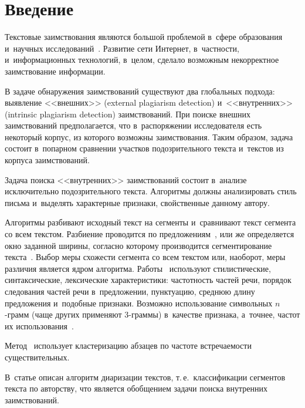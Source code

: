 \thispagestyle{headings}

\begin{multicols}{2}

\label{st\stat}



\section{Введение}

Текстовые заимствования являются большой проблемой в~сфере образования и~научных 
исследований~\cite{Stud_plag}. Развитие сети Интернет, в~част\-ности,
и~информационных технологий, в~целом, сделало возможным некорректное заимствование 
информации.

В задаче обнаружения заимствований существуют два глобальных подхода: выявление 
<<внешних>> (external plagiarism detection) и~<<внутренних>> (intrinsic 
plagiarism detection) заимствований. При поиске внешних заимствований 
предполагается, что в~распоряжении исследователя есть некоторый корпус, из 
которого возможны заимствования. Таким образом, задача состоит в~попарном 
сравнении участков подозрительного текста и~текстов из корпуса заимствований.

Задача поиска <<внутренних>> заимствований состоит в~анализе исключительно 
подозрительного текста. Алгоритмы должны анализировать стиль письма и~выделять 
характерные признаки, свойственные данному автору.

Алгоритмы разбивают исходный текст на сегменты и~сравнивают текст сегмента со 
всем текстом. Разбиение проводится по предложениям~\cite{Graz, Innsbruck}, или 
же определяется окно заданной ширины, согласно которому производится 
сегментирование текс\-та~\cite{Aegean, Weimar, Chile, Valencia}. Выбор меры 
схожести сегмента со всем текс\-том или, наоборот, меры различия является ядром 
алгоритма. Работы~\cite{Graz, Innsbruck, Weimar} используют стилистические, 
синтаксические, лексические характеристики: частотность частей речи, порядок 
следования частей речи в~предложении, пунктуацию, среднюю длину предложения 
и~подобные признаки. Возможно использование символьных $n$-грамм (чаще других 
применяют 3-грам\-мы) в~качестве признака, 
а~точнее, час\-тот их использования~\cite{Aegean, Valencia}. 

Метод~\cite{Surrey} использует кластеризацию абзацев по 
час\-то\-те встречаемости существительных. 

В~статье \cite{AP} описан алгоритм 
диаризации текстов, т.\,е.\ классификации сегментов текста по авторству, что 
является обобщением задачи поиска внутренних заимствований. 


\end{multicols}
